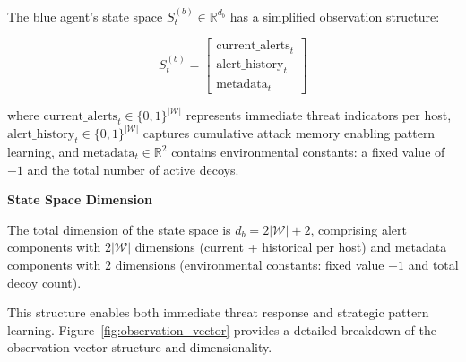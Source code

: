 \documentclass[12pt,oneside]{article}
\begin{document}
The blue agent's state space $S^{(b)}_t \in \mathbb{R}^{d_b}$ has a simplified observation structure:

\begin{equation}
S^{(b)}_t = \begin{bmatrix}
\text{current\_alerts}_t \\
\text{alert\_history}_t \\
\text{metadata}_t
\end{bmatrix}
\end{equation}

where $\text{current\_alerts}_t \in \{0,1\}^{|\mathcal{W}|}$ represents immediate threat indicators per host, $\text{alert\_history}_t \in \{0,1\}^{|\mathcal{W}|}$ captures cumulative attack memory enabling pattern learning, and $\text{metadata}_t \in \mathbb{R}^2$ contains environmental constants: a fixed value of $-1$ and the total number of active decoys.

\textbf{State Space Dimension}

The total dimension of the state space is $d_b = 2|\mathcal{W}| + 2$, comprising alert components with $2|\mathcal{W}|$ dimensions (current + historical per host) and metadata components with $2$ dimensions (environmental constants: fixed value $-1$ and total decoy count).

This structure enables both immediate threat response and strategic pattern learning. Figure~\ref{fig:observation_vector} provides a detailed breakdown of the observation vector structure and dimensionality.
\end{document}
